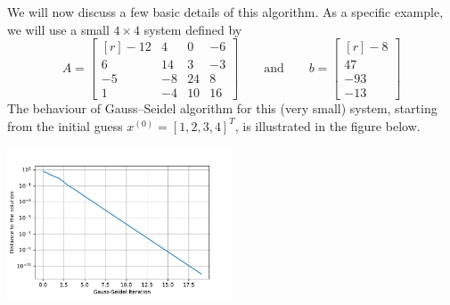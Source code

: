 \documentclass[10pt,a4paper]{article}
\theoremstyle{plain}
\theoremstyle{definition}
\begin{document}
We will now discuss a few basic details of this algorithm.
As a specific example, we will use a small \(4\times 4\) system
defined by
\begin{equation}\label{44}
  A = \begin{bmatrix*}[r]
  -12& 4& 0& -6\\
  6& 14& 3& -3\\
  -5& -8& 24& 8\\
  1& -4& 10& 16
  \end{bmatrix*}
  \qquad\text{and}\qquad
  b = \begin{bmatrix*}[r]-8\\47\\-93\\-13\end{bmatrix*}
\end{equation}
The behaviour of Gauss--Seidel algorithm for this (very small) system, starting from the initial guess \(x^{(0)} = [1,2,3,4]^T\), is illustrated in the figure below.
\begin{center}
  \includegraphics[width=0.5\textwidth]{./assets/gs44.pdf}
\end{center}
\end{document}

